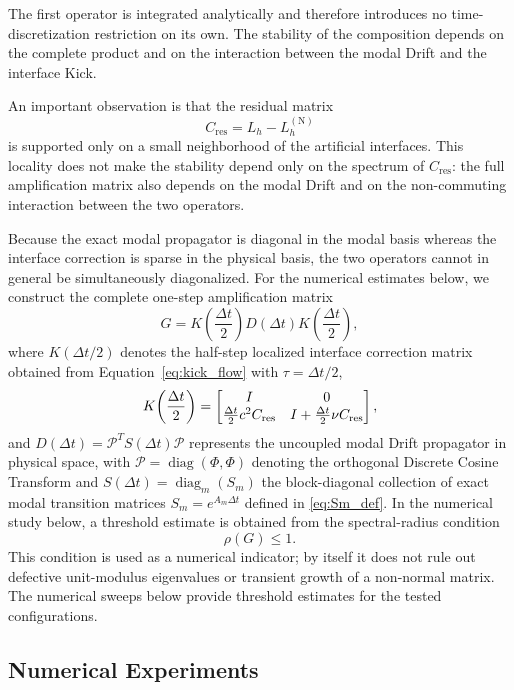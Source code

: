 \documentclass{Configuration_Files/PoliMi3i_thesis}
\newif\ifshowthesischanges
\DeclareRobustCommand{\thesischange}[2]{%
    \ifshowthesischanges
        \textcolor{#1}{#2}%
    \else
        #2%
    \fi
}
\DeclareRobustCommand{\thesischangecolor}[1]{%
    \ifshowthesischanges
        \color{#1}%
    \fi
}
\def\thesischange#1#2{#2}%
\begin{document}
The first operator is integrated analytically and therefore introduces no time-discretization restriction on its own. The stability of the composition depends on the complete product and on the interaction between the modal Drift and the interface Kick.

An important observation is that the residual matrix
\[
C_{\mathrm{res}}
=
L_h
-
L_h^{(\mathrm N)}
\]
is supported only on a small neighborhood of the artificial interfaces. This locality does not make the stability depend only on the spectrum of $C_{\mathrm{res}}$: the full amplification matrix also depends on the modal Drift and on the non-commuting interaction between the two operators.

Because the exact modal propagator is diagonal in the modal basis whereas the interface correction is sparse in the physical basis, the two operators cannot in general be simultaneously diagonalized. For the numerical estimates below, we construct the complete one-step amplification matrix
\[
G
=
K\!\left(\frac{\Delta t}{2}\right)
D(\Delta t)
K\!\left(\frac{\Delta t}{2}\right),
\]
\thesischange{red}{where $K(\Delta t/2)$ denotes the half-step localized interface correction matrix obtained from Equation~\eqref{eq:kick_flow} with $\tau = \Delta t/2$,}
\begin{equation*}
    {\thesischangecolor{red}K\!\left(\frac{\Delta t}{2}\right) = \begin{bmatrix} I & 0 \\ \frac{\Delta t}{2} c^2 C_{\mathrm{res}} & I + \frac{\Delta t}{2} \nu C_{\mathrm{res}} \end{bmatrix},}
\end{equation*}
\thesischange{red}{and $D(\Delta t) = \mathcal{P}^T S(\Delta t) \mathcal{P}$ represents the uncoupled modal Drift propagator in physical space, with $\mathcal{P} = \operatorname{diag}(\Phi, \Phi)$ denoting the orthogonal Discrete Cosine Transform and $S(\Delta t) = \operatorname{diag}_{m}(S_m)$ the block-diagonal collection of exact modal transition matrices $S_m = e^{A_m \Delta t}$ defined in \eqref{eq:Sm_def}.} In the numerical study below, a threshold estimate is obtained from the spectral-radius condition
\[
\rho(G)\le1.
\]
This condition is used as a numerical indicator; by itself it does not rule
out defective unit-modulus eigenvalues or transient growth of a non-normal
matrix. The numerical sweeps below provide threshold estimates for the tested
configurations.

\subsection{Numerical Experiments}
\end{document}
